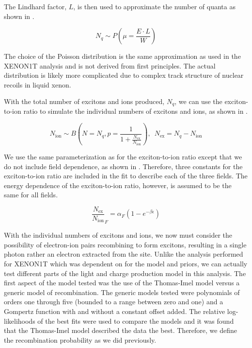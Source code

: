 The Lindhard factor, $L$, is then used to approximate the number of quanta as shown in .

\begin{equation}
        \label{eqn:nerix_nr_quanta}
        N_q \sim P \left( \mu = \frac{E \cdot L}{W} \right)
\end{equation}

The choice of the Poisson distribution is the same approximation as used in the XENON1T analysis and is not derived from first principles.  The actual distribution is likely more complicated due to complex track structure of nuclear recoils in liquid xenon.

With the total number of excitons and ions produced, $N_q$, we can use the exciton-to-ion ratio to simulate the individual numbers of excitons and ions, as shown in .

\begin{equation}
        \label{eqn:nerix_nr_exciton_ion}
        N_{\textrm{ion}} \sim B \left( N=N_q, p = \frac{1}{1 + \frac{N_{\textrm{ex}}}{N_{\textrm{ion}}}} \right) , \, \, \, N_{\textrm{ex}} = N_q - N_{\textrm{ion}}
\end{equation}

We use the same parameterization as  for the exciton-to-ion ratio except that we do not include field dependence, as shown in .  Therefore, three constants for the exciton-to-ion ratio are included in the fit to describe each of the three fields.  The energy dependence of the exciton-to-ion ratio, however, is assumed to be the same for all fields.

\begin{equation}
        \label{eqn:nerix_nr_exciton_ion_parameterization}
        \frac{N_{\textrm{ex}}}{N_{\textrm{ion}}}_F = \alpha_F \left( 1 - e^{-\beta \epsilon}  \right)
\end{equation}


With the individual numbers of excitons and ions, we now must consider the possibility of electron-ion pairs recombining to form excitons, resulting in a single photon rather an electron extracted from the site.  Unlike the analysis performed for XENON1T which was dependent on  for the model and priors, we can actually test different parts of the light and charge production model in this analysis.  The first aspect of the model tested was the use of the Thomas-Imel model \cite{thomas1987recombination} versus a generic model of recombination.  The generic models tested were polynomials of orders one through five (bounded to a range between zero and one) and a Gompertz function \cite{gompertz1825nature} with and without a constant offset added.  The relative log-likelihoods of the best fits were used to compare the models and it was found that the Thomas-Imel model described the data the best.  Therefore, we define the recombination probability as we did previously.


